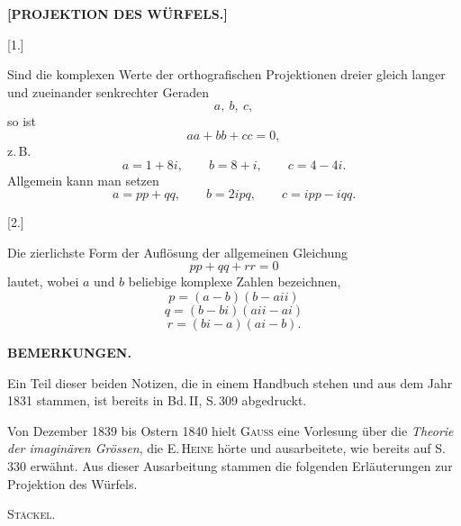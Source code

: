 \begin{center}\large\bfseries [PROJEKTION DES WÜRFELS.]\end{center}

\begin{center}[1.]\end{center}

Sind die komplexen Werte der orthografischen Projektionen dreier gleich langer und zueinander senkrechter Geraden
\[
a,\ b,\ c,
\]
so ist
\[
aa+bb+cc=0,
\]
z.\,B.
\[
a=1+8i,\qquad b=8+i,\qquad c=4-4i.
\]
Allgemein kann man setzen
\[
a=pp+qq,\qquad b=2ipq,\qquad c=ipp-iqq.
\]

\begin{center}[2.]\end{center}

Die zierlichste Form der Auflösung der allgemeinen Gleichung
\[
pp+qq+rr=0
\]
lautet, wobei $a$ und $b$ beliebige komplexe Zahlen bezeichnen,
\[
p=(a-b)(b-aii)
\]
\[
q=(b-bi)(aii-ai)
\]
\[
r=(bi-a)(ai-b).
\]

\begin{center}\bfseries BEMERKUNGEN.\end{center}

Ein Teil dieser beiden Notizen, die in einem Handbuch stehen und aus dem Jahr 1831 stammen, ist bereits in Bd.\,II, S.\,309 abgedruckt.

\indent Von Dezember 1839 bis Ostern 1840 hielt \textsc{Gauss} eine Vorlesung über die \emph{Theorie der imaginären Grössen}, die E.\,\textsc{Heine} hörte und ausarbeitete, wie bereits auf S.\,330 erwähnt. Aus dieser Ausarbeitung stammen die folgenden Erläuterungen zur Projektion des Würfels.
\par\noindent\hfill\textsc{Stäckel}.\par
